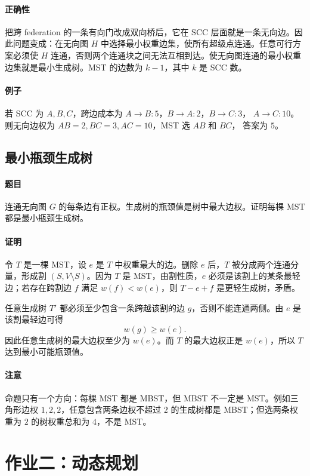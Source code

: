 \documentclass[UTF8,openany,12pt]{ctexbook}
\theoremstyle{remark}
\begin{document}
\paragraph{正确性}
把跨 federation 的一条有向门改成双向桥后，它在 SCC 层面就是一条无向边。因此问题变成：在无向图 $H$ 中选择最小权重边集，使所有超级点连通。任意可行方案必须使 $H$ 连通，否则两个连通块之间无法互相到达。使无向图连通的最小权重边集就是最小生成树。MST 的边数为 $k-1$，其中 $k$ 是 SCC 数。

\paragraph{例子}
若 SCC 为 $A,B,C$，跨边成本为 $A\to B:5$，$B\to A:2$，$B\to C:3$，
$A\to C:10$。则无向边权为 $AB=2,BC=3,AC=10$，MST 选 $AB$ 和 $BC$，
答案为 $5$。

\subsection{最小瓶颈生成树}

\paragraph{题目}
连通无向图 $G$ 的每条边有正权。生成树的瓶颈值是树中最大边权。证明每棵 MST 都是最小瓶颈生成树。

\paragraph{证明}
令 $T$ 是一棵 MST，设 $e$ 是 $T$ 中权重最大的边。删除 $e$ 后，$T$ 被分成两个连通分量，形成割 $(S,V\setminus S)$。因为 $T$ 是 MST，由割性质，$e$ 必须是该割上的某条最轻边；若存在跨割边 $f$ 满足 $w(f)<w(e)$，则 $T-e+f$ 是更轻生成树，矛盾。

任意生成树 $T'$ 都必须至少包含一条跨越该割的边 $g$，否则不能连通两侧。由 $e$ 是该割最轻边可得
\[
  w(g)\ge w(e).
\]
因此任意生成树的最大边权至少为 $w(e)$。而 $T$ 的最大边权正是 $w(e)$，所以
$T$ 达到最小可能瓶颈值。

\paragraph{注意}
命题只有一个方向：每棵 MST 都是 MBST，但 MBST 不一定是 MST。例如三角形边权
$1,2,2$，任意包含两条边权不超过 $2$ 的生成树都是 MBST；但选两条权重为 $2$ 的树权重总和为
$4$，不是 MST。

\section{作业二：动态规划}
\end{document}

